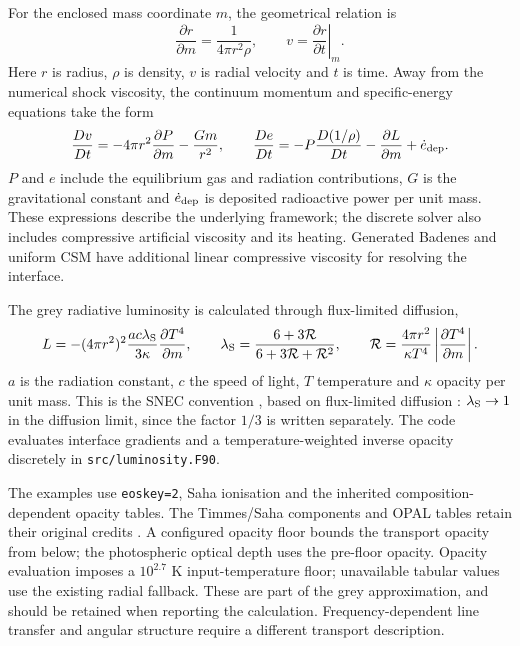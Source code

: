 \documentclass[11pt,a4paper]{article}
\newcommand{\code}[1]{\nolinkurl{#1}}
\begin{document}
For the enclosed mass coordinate $m$, the geometrical relation is
\begin{equation}
 \frac{\partial r}{\partial m}=\frac{1}{4\pi r^2\rho},\qquad
 v=\left.\frac{\partial r}{\partial t}\right|_m .
 \label{eq:mass}
\end{equation}
Here $r$ is radius, $\rho$ is density, $v$ is radial velocity and $t$ is time. Away from the numerical shock viscosity, the continuum momentum and specific-energy equations take the form
\begin{equation}
 \frac{Dv}{Dt}=-4\pi r^2\frac{\partial P}{\partial m}-\frac{Gm}{r^2},\qquad
 \frac{De}{Dt}=-P\frac{D(1/\rho)}{Dt}-\frac{\partial L}{\partial m}+\dot e_{\rm dep} .
 \label{eq:hydro}
\end{equation}
$P$ and $e$ include the equilibrium gas and radiation contributions, $G$ is the gravitational constant and $\dot e_{\rm dep}$ is deposited radioactive power per unit mass. These expressions describe the underlying framework; the discrete solver also includes compressive artificial viscosity and its heating. Generated Badenes and uniform CSM have additional linear compressive viscosity for resolving the interface.

The grey radiative luminosity is calculated through flux-limited diffusion,
\begin{equation}
 L=-(4\pi r^2)^2\frac{ac\lambda_{\rm S}}{3\kappa}\frac{\partial T^4}{\partial m},\qquad
 \lambda_{\rm S}=\frac{6+3\mathcal R}{6+3\mathcal R+\mathcal R^2},\qquad
 \mathcal R=\frac{4\pi r^2}{\kappa T^4}\left|\frac{\partial T^4}{\partial m}\right| .
 \label{eq:fld}
\end{equation}
$a$ is the radiation constant, $c$ the speed of light, $T$ temperature and $\kappa$ opacity per unit mass. This is the SNEC convention \cite{snecmanual}, based on flux-limited diffusion \cite{levermore1981}: $\lambda_{\rm S}\rightarrow1$ in the diffusion limit, since the factor $1/3$ is written separately. The code evaluates interface gradients and a temperature-weighted inverse opacity discretely in \code{src/luminosity.F90}.

The examples use \code{eoskey=2}, Saha ionisation and the inherited composition-dependent opacity tables. The Timmes/Saha components and OPAL tables retain their original credits \cite{timmes1999,timmes2000,opal1996}. A configured opacity floor bounds the transport opacity from below; the photospheric optical depth uses the pre-floor opacity. Opacity evaluation imposes a $10^{2.7}$ K input-temperature floor; unavailable tabular values use the existing radial fallback. These are part of the grey approximation, and should be retained when reporting the calculation. Frequency-dependent line transfer and angular structure require a different transport description.
\end{document}
